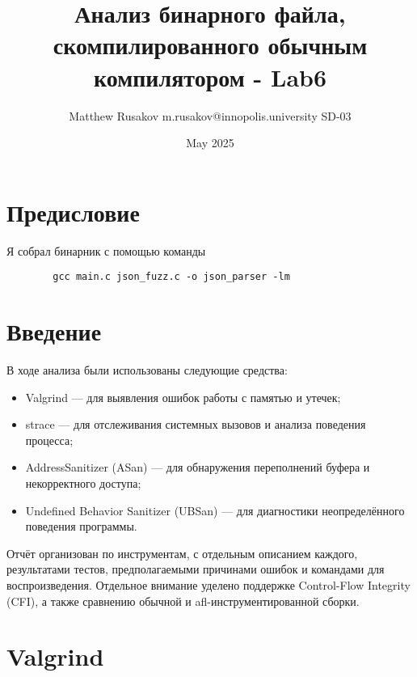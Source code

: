 \usepackage[utf8]{inputenc}
\usepackage[russian]{babel}
\usepackage{geometry}
\usepackage{graphicx}
\usepackage{hyperref}
\usepackage{listings}
\usepackage{color}
\usepackage[T1]{fontenc}
\geometry{margin=2.5cm}
\title{Анализ бинарного файла, скомпилированного обычным компилятором - Lab6}
\author{Matthew Rusakov m.rusakov@innopolis.university SD-03}
\date{May 2025}


    \maketitle

    \section*{Предисловие}

    Я собрал бинарник с помощью команды
    \begin{verbatim}
        gcc main.c json_fuzz.c -o json_parser -lm
    \end{verbatim}


    \section{Введение}

    В ходе анализа были использованы следующие средства:
    \begin{itemize}
        \item Valgrind — для выявления ошибок работы с памятью и утечек;
        \item strace — для отслеживания системных вызовов и анализа поведения процесса;
        \item AddressSanitizer (ASan) — для обнаружения переполнений буфера и некорректного доступа;
        \item Undefined Behavior Sanitizer (UBSan) — для диагностики неопределённого поведения программы.
    \end{itemize}

    Отчёт организован по инструментам, с отдельным описанием каждого, результатами тестов, предполагаемыми причинами ошибок и командами для воспроизведения.
    Отдельное внимание уделено поддержке Control-Flow Integrity (CFI), а также сравнению обычной и afl-инструментированной сборки.


    \section{Valgrind}

